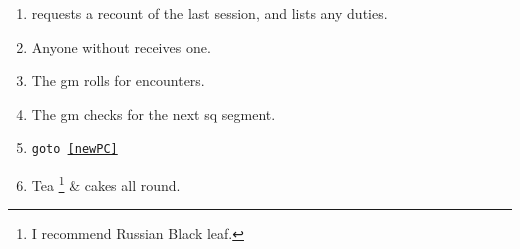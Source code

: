 
\begin{enumerate}
  \item
   requests a recount of the last session, and lists any duties.
  \item
  Anyone without  receives one.
  \label{newPC}
  \item
  The \gls{gm} rolls for encounters.
  \item
  The \gls{gm} checks for the next \gls{sq} \gls{segment}.
  \item
  {\tt goto \ref{newPC}}
  \item
  Tea%
  \footnote{I recommend Russian Black leaf.}
  \& cakes all round.
\end{enumerate}
